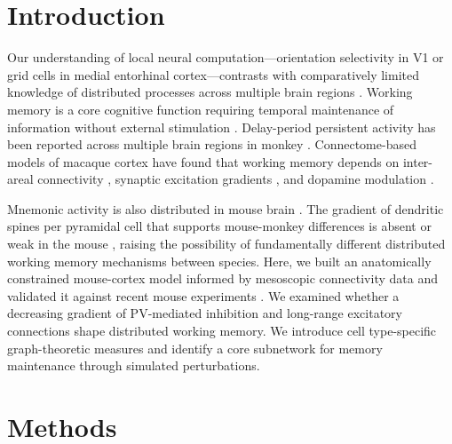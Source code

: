 \documentclass[11pt]{article}
\begin{document}
\section{Introduction}
Our understanding of local neural computation---orientation selectivity in V1 or grid cells in medial entorhinal cortex---contrasts with comparatively limited knowledge of distributed processes across multiple brain regions \cite{wang2022theory,steinmetz2021neuropixels,stringer2019spontaneous,musall2019singletrial,jun2017fully,steinmetz2019distributed}. Working memory is a core cognitive function requiring temporal maintenance of information without external stimulation \cite{baddeley2012working}. Delay-period persistent activity has been reported across multiple brain regions in monkey \cite{fuster1971neuron,funahashi1989mnemonic,goldmanrakic1995cellular,wang2001synaptic,leavitt2017sustained,christophel2017distributed,dotson2018parallel,suzuki2013distinct,xu2017visual}. Connectome-based models of macaque cortex have found that working memory depends on inter-areal connectivity \cite{murray2017multiple,jaramillo2019nonhomogeneous}, synaptic excitation gradients \cite{wang2020macroscopic,mejias2022mechanisms}, and dopamine modulation \cite{froudistwalsh2021dopamine}.

Mnemonic activity is also distributed in mouse brain \cite{liu2014activation,schmitt2017thalamic,guo2017maintenance,bolkan2017thalamic,gilad2018distributed}. The gradient of dendritic spines per pyramidal cell that supports mouse-monkey differences is absent or weak in the mouse \cite{gilman2017areal,ballesteros2010density}, raising the possibility of fundamentally different distributed working memory mechanisms between species. Here, we built an anatomically constrained mouse-cortex model informed by mesoscopic connectivity data \cite{oh2014mesoscale,gamanut2018mouse,harris2019hierarchical,kim2017brain} and validated it against recent mouse experiments \cite{guo2017maintenance,gilad2018distributed}. We examined whether a decreasing gradient of PV-mediated inhibition \cite{kim2017brain,fulcher2019multimodal,wang2020macroscopic} and long-range excitatory connections shape distributed working memory. We introduce cell type-specific graph-theoretic measures and identify a core subnetwork for memory maintenance through simulated perturbations.

\section{Methods}
\end{document}
